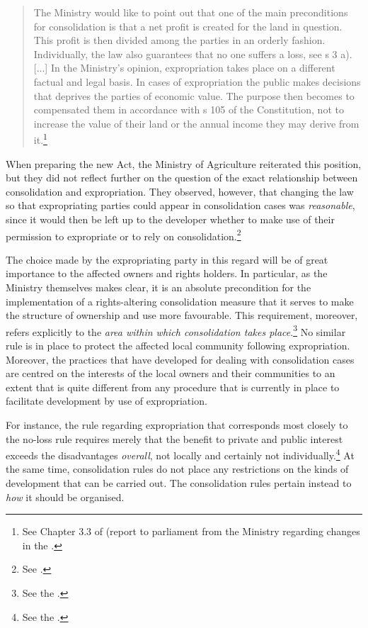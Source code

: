 \begin{quote}
The Ministry would like to point out that one of the main preconditions for consolidation is that a net profit is created for the land in question. This profit is then divided among the parties in an orderly fashion. Individually, the law also guarantees that no one suffers a loss, see s 3 a). [...] In the Ministry's opinion, expropriation takes place on a different factual and legal basis. In cases of expropriation the public makes decisions that deprives the parties of economic value. The purpose then becomes to compensated them in accordance with s 105 of the Constitution, not to increase the value of their land or the annual income they may derive from it.\footnote{See Chapter 3.3 of \cite{otprp78} (report to parliament from the Ministry regarding changes in the \cite{lca79}.}
\end{quote}

When preparing the new Act, the Ministry of Agriculture reiterated this position, but they did not reflect further on the question of the exact relationship between consolidation and expropriation. They observed, however, that changing the law so that expropriating parties could appear in consolidation cases was \emph{reasonable}, since it would then be left up to the developer whether to make use of their permission to expropriate or to rely on consolidation.\footnote{See \cite[84]{prop12}.}

The choice made by the expropriating party in this regard will be of great importance to the affected owners and rights holders. In particular, as the Ministry themselves makes clear, it is an absolute precondition for the implementation of a rights-altering consolidation measure that it serves to make the structure of ownership and use more favourable. This requirement, moreover, refers explicitly to the \emph{area within which consolidation takes place}.\footnote{See the \cite[3-3]{lca13}.} No similar rule is in place to protect the affected local community following expropriation. Moreover, the practices that have developed for dealing with consolidation cases are centred on the interests of the local owners and their communities to an extent that is quite different from any procedure that is currently in place to facilitate development by use of expropriation.

For instance, the rule regarding expropriation that corresponds most closely to the no-loss rule  
requires merely that the benefit to private and public interest exceeds the disadvantages \emph{overall}, not locally and certainly not individually.\footnote{See the \cite[2]{ea59}.} At the same time, consolidation rules do not place any restrictions on the kinds of development that can be carried out. The consolidation rules pertain instead to \emph{how} it should be organised. 

